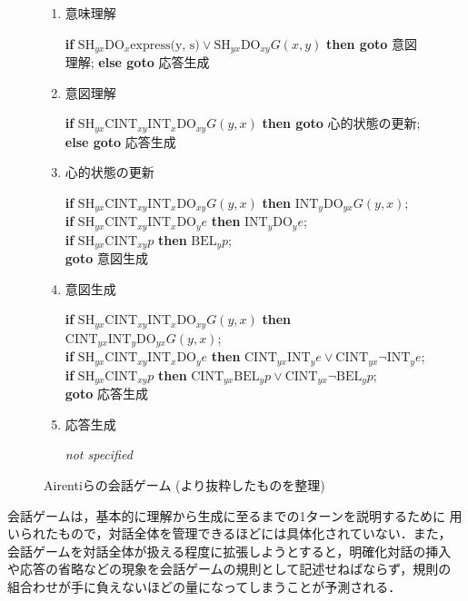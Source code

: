 \begin{figure}[htbp]
\small
\begin{enumerate}
\item {\dg 意味理解}

\noindent
{\bf if} $\mbox{SH}_{yx}\mbox{DO}_x \mbox{express(y, s)}
\lor \mbox{SH}_{yx}\mbox{DO}_{xy} G(x,y)$
{\bf then goto} 意図理解;
{\bf else goto} 応答生成

\item {\dg 意図理解}

\noindent
{\bf if} $\mbox{SH}_{yx}\mbox{CINT}_{xy} \mbox{INT}_x
\mbox{DO}_{xy} G(y,x)$
{\bf then goto} 心的状態の更新;
{\bf else goto} 応答生成

\item {\dg 心的状態の更新}

\noindent
{\bf if} $\mbox{SH}_{yx}\mbox{CINT}_{xy} \mbox{INT}_x
 \mbox{DO}_{xy} G(y,x)$
{\bf then} $\mbox{INT}_y \mbox{DO}_{yx} G(y,x)$;\\
{\bf if}   $\mbox{SH}_{yx}\mbox{CINT}_{xy} \mbox{INT}_x
 \mbox{DO}_y e$
{\bf then}   $\mbox{INT}_y \mbox{DO}_y e$;\\
{\bf if}   $\mbox{SH}_{yx}\mbox{CINT}_{xy} p$
{\bf then}   $\mbox{BEL}_y p$;\\
{\bf goto}   意図生成

\item {\dg 意図生成}

\noindent
{\bf if} $\mbox{SH}_{yx}\mbox{CINT}_{xy} \mbox{INT}_x
 \mbox{DO}_{xy} G(y,x)$
{\bf then}  $\mbox{CINT}_{yx} \mbox{INT}_y 
\mbox{DO}_{yx} G(y,x)$;\\
{\bf if}  $\mbox{SH}_{yx}\mbox{CINT}_{xy} \mbox{INT}_x
 \mbox{DO}_y e$
{\bf then}  $\mbox{CINT}_{yx} \mbox{INT}_y e \lor
\mbox{CINT}_{yx} \lnot \mbox{INT}_y e$;\\
{\bf if}  $\mbox{SH}_{yx}\mbox{CINT}_{xy} p$
{\bf then}  $\mbox{CINT}_{yx} \mbox{BEL}_y p
\lor \mbox{CINT}_{yx} \lnot \mbox{BEL}_y p$;\\
{\bf goto} 応答生成

\item {\dg 応答生成}

\noindent
{\it not specified}

\end{enumerate}
\caption{Airentiらの会話ゲーム (\cite{airenti93}より抜粋したものを整理)}
\label{airenti}
\end{figure}

会話ゲームは，基本的に理解から生成に至るまでの1ターンを説明するために
用いられたもので，対話全体を管理できるほどには具体化されていない．また，
会話ゲームを対話全体が扱える程度に拡張しようとすると，明確化対話の挿入
や応答の省略などの現象を会話ゲームの規則として記述せねばならず，規則の
組合わせが手に負えないほどの量になってしまうことが予測される．

